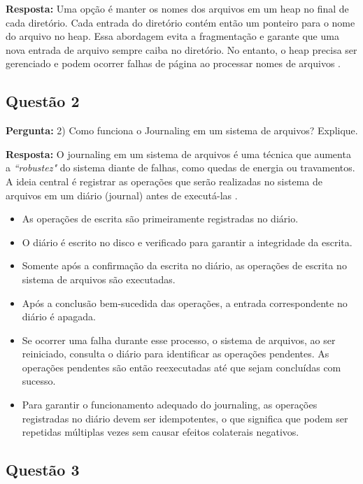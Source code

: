 \documentclass{article}
\begin{document}
\textbf{Resposta:} Uma opção é manter os nomes dos arquivos em um heap no final de cada diretório. Cada entrada do diretório contém então um ponteiro para o nome do arquivo no heap. Essa abordagem evita a fragmentação e garante que uma nova entrada de arquivo sempre caiba no diretório. No entanto, o heap precisa ser gerenciado e podem ocorrer falhas de página ao processar nomes de arquivos \parencite[p. 145]{tanenbaum2021}. 

\subsection{Questão 2}

\textbf{Pergunta:} 2) Como funciona o Journaling em um sistema de arquivos? Explique.\newline

\textbf{Resposta:} O journaling em um sistema de arquivos é uma técnica que aumenta a \textit{``robustez"} do sistema diante de falhas, como quedas de energia ou travamentos. A ideia central é registrar as operações que serão realizadas no sistema de arquivos em um diário (journal) antes de executá-las \parencite[p. 145]{tanenbaum2021}.

\begin{itemize}
  \item As operações de escrita são primeiramente registradas no diário. 
  \item O diário é escrito no disco e verificado para garantir a integridade da escrita.
  \item Somente após a confirmação da escrita no diário, as operações de escrita no sistema de arquivos são executadas.
  \item Após a conclusão bem-sucedida das operações, a entrada correspondente no diário é apagada.
  \item Se ocorrer uma falha durante esse processo, o sistema de arquivos, ao ser reiniciado, consulta o diário para identificar as operações pendentes. As operações pendentes são então reexecutadas até que sejam concluídas com sucesso.
  \item Para garantir o funcionamento adequado do journaling, as operações registradas no diário devem ser idempotentes, o que significa que podem ser repetidas múltiplas vezes sem causar efeitos colaterais negativos. 
\end{itemize}


\subsection{Questão 3}
\end{document}
